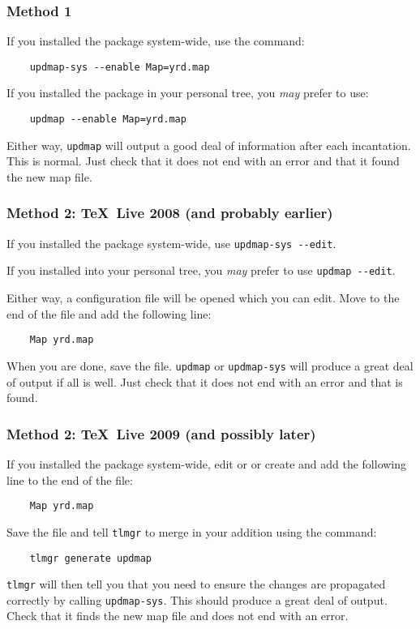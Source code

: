 \documentclass[11pt,british]{article}
\begin{document}
\subsubsection{Method 1}

If you installed the package system-wide, use the command:
\begin{verbatim}
	updmap-sys --enable Map=yrd.map
\end{verbatim}
If you installed the package in your personal tree, you \emph{may} prefer to use:
\begin{verbatim}
	updmap --enable Map=yrd.map
\end{verbatim}

Either way, \verb|updmap| will output a good deal of information after each incantation. This is normal. Just check that it does not end with an error and that it found the new map file.

\subsubsection{Method 2: \TeX~Live 2008 (and probably earlier)}

If you installed the package system-wide, use \verb|updmap-sys --edit|.

If you installed into your personal tree, you \emph{may} prefer to use	\verb|updmap --edit|.

Either way, a configuration file will be opened which you can edit. Move to the end of the file and add the following line:
\begin{verbatim}
	Map yrd.map
\end{verbatim}
When you are done, save the file. \verb|updmap| or \verb|updmap-sys| will produce a great deal of output if all is well. Just check that it does not end with an error and that  is found.

\subsubsection{Method 2: \TeX~Live 2009 (and possibly later)}

If you installed the package system-wide, edit or or create  and add the following line to the end of the file:
\begin{verbatim}
	Map yrd.map
\end{verbatim}
Save the file and tell \verb|tlmgr| to merge in your addition using the command:
\begin{verbatim}
	tlmgr generate updmap
\end{verbatim}
\verb|tlmgr| will then tell you that you need to ensure the changes are propagated correctly by calling \verb|updmap-sys|. This should produce a great deal of output. Check that it finds the new map file and does not end with an error.
\end{document}
